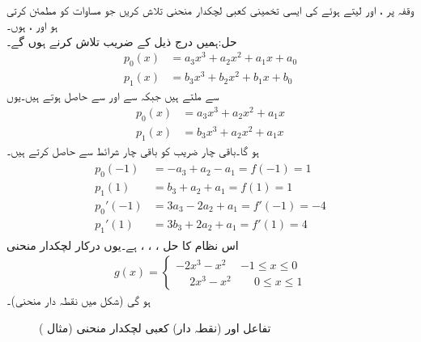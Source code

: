 \quad {}\\
وقفہ  پر ،  اور  لیتے ہوئے   کی ایسی تخمینی کعبی لچکدار منحنی تلاش کریں جو مساوات  کو مطمئن کرتی ہو اور ،  ہوں۔\\
حل:\quad ہمیں درج ذیل کے  ضریب  تلاش کرنے ہوں گے۔
\begin{align*}
p_0(x)&=a_3x^3+a_2x^2+a_1x+a_0\\
p_1(x)&=b_3x^3+b_2x^2+b_1x+b_0
\end{align*}
 سے  ملتے ہیں جبکہ  سے  اور  سے  حاصل ہوتے ہیں۔یوں
\begin{align*}
p_0(x)&=a_3x^3+a_2x^2+a_1x\\
p_1(x)&=b_3x^3+a_2x^2+a_1x
\end{align*}
ہو گا۔باقی چار  ضریب   کو باقی چار شرائط سے حاصل کرتے ہیں۔
\begin{gather}
\begin{aligned}\label{مساوات_اعدادی_دو_درجی_تفرق_ت}
p_0(-1)&=-a_3+a_2-a_1=f(-1)=1\\
p_1(1)&=b_3+a_2+a_1=f(1)=1\\
p_0'(-1)&=3a_3-2a_2+a_1=f'(-1)=-4\\
p_1'(1)&=3b_3+2a_2+a_1=f'(1)=4
\end{aligned}
\end{gather}
اس نظام کا حل ، ، ،  ہے۔یوں درکار لچکدار منحنی
\begin{align}\label{مساوات_اعدادی_دو_درجی_تفرق_ٹ}
g(x)=
\begin{cases}
-2x^3-x^2&-1\le x\le 0\\
\phantom{-}2x^3-x^2&\phantom{-}0\le x\le 1
\end{cases}
\end{align}
ہو گی (شکل  میں نقطہ دار منحنی)۔ 
\begin{figure}
\centering
{}
\caption{تفاعل  اور (نقطہ دار) کعبی لچکدار منحنی  (مثال )}
\label{شکل_مثال_اعدادی_کعبی_لچکدار_منحنی_الف}
\end{figure}
